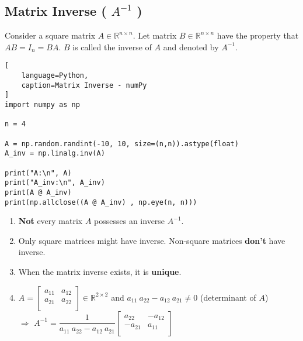 \subsection{Matrix Inverse ( $A^{-1}$ ) \cite{mfml/book/mml/Deisenroth-Faisal-Ong}}

Consider a square matrix $A \in \mathbb{R}^{n\times n}$. Let matrix $B \in \mathbb{R}^{n\times n}$ have the property that $AB = I_n = BA$. $B$ is called the inverse of $A$ and denoted by $A^{-1}$.
\hfill \cite{mfml/book/mml/Deisenroth-Faisal-Ong}





\begin{lstlisting}[
    language=Python,
    caption=Matrix Inverse - numPy
]
import numpy as np

n = 4

A = np.random.randint(-10, 10, size=(n,n)).astype(float)
A_inv = np.linalg.inv(A)

print("A:\n", A)
print("A_inv:\n", A_inv)
print(A @ A_inv)
print(np.allclose((A @ A_inv) , np.eye(n, n)))
\end{lstlisting}






\begin{enumerate}[itemsep=0.2cm]
    \item \textbf{Not} every matrix $A$ possesses an inverse $A^{-1}$.
    \hfill \cite{mfml/book/mml/Deisenroth-Faisal-Ong}

    \item Only square matrices might have inverse. Non-square matrices \textbf{don't} have inverse.

    \item When the matrix inverse exists, it is \textbf{unique}.
    \hfill \cite{mfml/book/mml/Deisenroth-Faisal-Ong}

    \item $
        A = \begin{bmatrix}
            a_{11} & a_{12} \\
            a_{21} & a_{22} \\
        \end{bmatrix} 
        \in \mathbb{R}^{2\times 2}
    $
    \hspace{1cm} and \hspace{1cm}
    $a_{11}\ a_{22} - a_{12}\ a_{21} \neq 0$ (determinant of $A$)\\[0.4cm] 
    $\Rightarrow$
    $
        A^{-1} = 
        \dfrac{1}{a_{11}\ a_{22} - a_{12}\ a_{21}}
        \begin{bmatrix}
            a_{22} & -a_{12} \\
            -a_{21} & a_{11} \\
        \end{bmatrix}
    $
    \hfill \cite{mfml/book/mml/Deisenroth-Faisal-Ong}

\end{enumerate}



